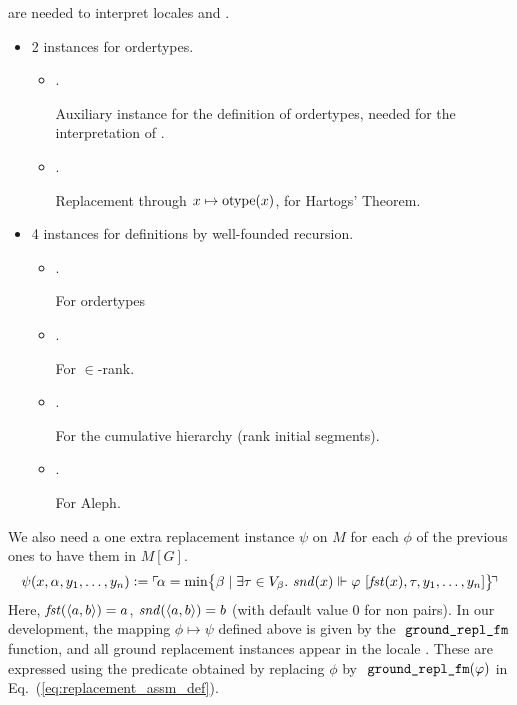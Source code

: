 are needed to interpret locales  and
.
\begin{itemize}
\item
  2 instances for ordertypes.
  \begin{itemize}
  \item
    .

    Auxiliary instance for the definition of ordertypes, needed for
    the interpretation of .
  \item
    .

    Replacement through $x\mapsto \operatorname{otype}(x)$, for Hartogs' Theorem.
  \end{itemize}
\item
  4 instances for definitions by well-founded recursion.
  \begin{itemize}
  \item {}.

    For ordertypes
  \item {}.

    For $\in$-rank.
  \item {}.

    For the cumulative hierarchy (rank initial segments).
  \item
    .

    For Aleph.
  \end{itemize}
\end{itemize}

We also need a one extra replacement instance $\psi$ on $M$ for each
$\phi$ of the
previous ones to have them in $M[G]$.
\[
  \psi(x,\alpha,y_1,\dots,y_n) \mathrel{\mathop:}= \ulcorner{\!\alpha = \min \bigl\{
    \beta \mid \exists\tau\in V_\beta.\  \mathit{snd}(x) \Vdash\varphi\ [\mathit{fst}(x),\tau,y_1,\dots,y_n]\bigr\}\!}\urcorner
\]
Here, $\mathit{fst}(\langle a,b\rangle) = a$, $\mathit{snd}(\langle a,b\rangle) = b$
(with default value $0$ for non pairs).
In our development, the mapping $\phi\mapsto\psi$ defined above is given by the
$\isatt{ground{\uscore}repl{\uscore}fm}$ function, and all ground replacement
instances appear in the locale . These are expressed using
the  predicate
obtained by replacing $\phi$ by
$\isatt{ground{\uscore}repl{\uscore}fm}(\phi)$ in Eq.~(\ref{eq:replacement_assm_def}).

